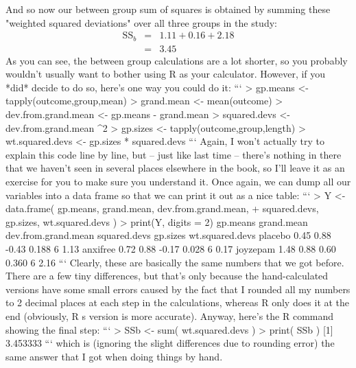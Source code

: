 And so now our between group sum of squares is obtained by summing these "weighted squared deviations" over all three groups in the study:
$$
\begin{array}{rcl}
\mbox{SS}_{b} &=& 1.11 + 0.16 + 2.18 \\
&=& 3.45
\end{array}
$$
As you can see, the between group calculations are a lot shorter, so you probably wouldn't usually want to bother using R as your calculator. However, if you *did* decide to do so, here's one way you could do it:
```
> gp.means <- tapply(outcome,group,mean)
> grand.mean <- mean(outcome)
> dev.from.grand.mean <- gp.means - grand.mean
> squared.devs <- dev.from.grand.mean ^2
> gp.sizes <- tapply(outcome,group,length)
> wt.squared.devs <- gp.sizes * squared.devs
```
Again, I won't actually try to explain this code line by line, but -- just like last time -- there's nothing in there that we haven't seen in several places elsewhere in the book, so I'll leave it as an exercise for you to make sure you understand it. Once again, we can dump all our variables into a data frame so that we can print it out as a nice table:
```
> Y <- data.frame( gp.means, grand.mean, dev.from.grand.mean, 
+                  squared.devs, gp.sizes, wt.squared.devs )
> print(Y, digits = 2)
         gp.means grand.mean dev.from.grand.mean squared.devs gp.sizes wt.squared.devs
placebo      0.45       0.88               -0.43        0.188        6            1.13
anxifree     0.72       0.88               -0.17        0.028        6            0.17
joyzepam     1.48       0.88                0.60        0.360        6            2.16
```
Clearly, these are basically the same numbers that we got before. There are a few tiny differences, but that's only because the hand-calculated versions have some small errors caused by the fact that I rounded all my numbers to 2 decimal places at each step in the calculations, whereas R only does it at the end (obviously, R s version is more accurate). Anyway, here's the R command showing the final step:
```
> SSb <- sum( wt.squared.devs )
> print( SSb )
[1] 3.453333
```
which is (ignoring the slight differences due to rounding error) the same answer that I got when doing things by hand.


